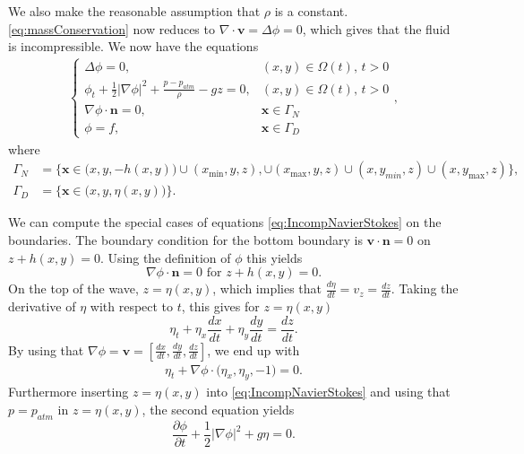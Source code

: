 \documentclass[12pt]{article}
\begin{document}
We also make the reasonable assumption that $\rho$ is a constant. \eqref{eq:massConservation} now reduces to
$\nabla \cdot \bm{v} = \Delta \phi = 0$, which gives that the fluid is incompressible. We now have
the equations
\begin{align}
    \label{eq:IncompNavierStokes}
    \begin{cases}
        \Delta \phi = 0,                                                 &    (x,y) \in \Omega(t), \, t > 0 \\
        \phi_t + \frac{1}{2}|\nabla \phi|^2 + \frac{p-p_{atm}}{\rho} - g z = 0,
                                                                         &    (x,y) \in \Omega(t), \, t > 0 \\
        \nabla \phi \cdot \bm{n} = 0,                                    &    \bm{x} \in \Gamma_N \\
        \phi = f,                                                        &    \bm{x} \in \Gamma_D
    \end{cases},
\end{align}
where
\begin{align*}
    \Gamma_N & = \big\{\bm{x} \in \big(x,y,-h(x,y)\big) \cup (x_{\min}, y, z), \cup (x_{\max}, y, z) \cup (x, y_{min}, z) \cup (x, y_{\max}, z)\big\}, \\
    \Gamma_D & = \big\{ \bm{x} \in \big(x,y, \eta(x,y)\big) \big\}.
\end{align*}

We can compute the special cases of equations \eqref{eq:IncompNavierStokes} on the boundaries. 
The boundary condition for the bottom boundary is $\bm{v} \cdot \bm{n} = 0 $ on $z + h(x,y) = 0$. Using the definition of $\phi$ this yields
\begin{equation}
    \label{eq:phit}%
    \nabla \phi  \cdot \bm{n} = 0 \text{ for } z + h(x,y) = 0. 
\end{equation}
On the top of the wave, $z = \eta(x,y)$, which implies that $\frac{d\eta}{dt} = v_z = \frac{dz}{dt}$. Taking the derivative of $\eta$ with respect to $t$, this gives for $z = \eta(x,y)$
\begin{equation*}
    \eta_t + \eta_x\frac{dx}{dt} + \eta_y\frac{dy}{dt} = \frac{dz}{dt}. 
\end{equation*}
By using that $\nabla\phi = \bm{v} = [\frac{dx}{dt}, \frac{dy}{dt}, \frac{dz}{dt}]$, we end up with
\begin{align}
    \label{eq:etaEq}%
    \eta_t + \nabla\phi\cdot \big(\eta_x, \eta_y, - 1\big) = 0.
\end{align}
Furthermore inserting $z = \eta(x,y)$ into \eqref{eq:IncompNavierStokes} and using that $p = p_{atm}$ in $z = \eta(x,y)$, the second equation yields
\begin{equation}
    \label{eq:phiEq}
    \frac{\partial \phi }{\partial t} + \frac{1}{2}|\nabla \phi |^2 + g\eta = 0.
\end{equation}
%
%
\end{document}
